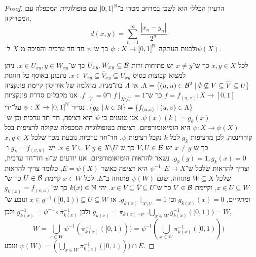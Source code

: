 \begin{proof}
	הרעיון הכללי הוא לשכן במרחב מטרי ב־${[0, 1]}^{\mathbb{N}}$ עם טופולוגיית המכפלה עם המטריקה,
	\[
		d(x, y)
		= \sum_{n = 1}^\infty \frac{|x_n - y_n|}{2^n}
	\]
	ולבנות העתקה $\psi : X \to {[0, 1]}^{\mathbb{N}}$ כך ש־$\psi$ חד־חד ערכית והפיכה מ־$X$ ל־$\psi(X)$.

	לכל $x, y \in X$ כך ש־$x \ne y$ יש פתוחות זרות $U_{xy}, W_{xy} \subseteq \mathcal{B}$ כך ש־$x \in U_{xy}, y \in W_{xy}$.
	ניתן למצוא קבוצות בסיס $x \in V_{xy} \subseteq \overline{V}_{xy} \subseteq U_{xy}$.
	נתבונן באוסף כל הזוגות $\Lambda = \{ (u, u) \in \mathcal{B}^2 \mid \emptyset \not\subseteq V \subseteq \overline{V} \subseteq U \}$.
	אז $\Lambda$ בת־מניה.
	מהלמה של אוריסון קיימת פונקציה $f = f_{(u, v)} : X \to [0, 1]$ כך ש־$f \mid_{X \setminus U} = 1$ ו־$f \mid_{\overline{V}} = 0$.
	אנו מקבלים סדרת פונקציות $\{ g_k \mid k \in \mathbb{N} \} = \{ f_{(u, v)} \mid (u, v) \in \Lambda \}$.
	נגדיר $\psi : X \to {[0, 1]}^{\mathbb{N}}$ על־ידי $\psi(x)(k) = g_k(x)$.
	אנו טוענים כי $\psi$ היא רציפה, חד־חד ערכית וכן ש־$\psi : X \to \psi(X)$ היא הומיאומורפיזם.
	רציפות בטופולוגיית המכפלה שקולה לרציפות בכל קורדינטה, לכן מרציפות $g_k$ לכל $k$ נקבל רציפות $\psi$.
	חד־חד ערכיות נובעת מכך שלכל $x, y \in X$ כך ש־$x \ne y$ יש $V, U \in \mathcal{B}$ כך ש־$x \in V \subseteq \overline{V}, y \in X \setminus U$.
	יש $g_k = f_{(v, u)}$ ו־$g_k(y) = 1, g_k(x) = 0$.
	נשאר להראות הומיאומורפיזם.
	אנו יודעים ש־$\psi$ חד־חד ערכית, וצריך להראות שלכל ש־$\psi^{-1} : E \to X$ היא רציפה כאשר $E = \psi(X)$, כלומר צריך להראות שלכל $W \subseteq X$ פתוחה, שגם $\psi(W)$ פתוחה ב־$E$.
	לכל $x \in W$ קיימת $U \in \mathcal{B}$ כך ש־$x \in U \subseteq W$, וקיימת $V \in \mathcal{B}$ כך ש־$x \in V \subseteq \overline{V} \subseteq U$.
	יהי $k(x) \in \mathbb{N}$ כך ש־$g_{k(x)} = f_{(v, u)}$ ומתקיים, $g_{k(x)}(x) = 0$ וכן $g_{k(x)} \mid_{X \setminus U} = 1$.
	אז $x \in g^{-1}([0, 1)) \subseteq U \subseteq W$ ונובע ש־$\bigcup_{x \in W} g_{k(x)}^{-1}([0, 1)) = W$.
	$g_{k(x)} = \pi_{k(x) \circ \psi}$ ולכן $g_{k(x)}^{-1} = \psi^{-1} \circ \pi_{k(x)}^{-1}$ ולכן,
	\[
		W
		= \bigcup_{x \in W} \psi^{-1}(\pi_{k(x)}^{-1}([0, 1)))
		= \psi^{-1}(\bigcup_{x \in W} \pi_{k(x)}^{-1}([0, 1)))
	\]
	ונובע $\psi(W) = (\bigcup_{x \in W} \pi_{k(x)}^{-1}([0, 1))) \cap E$.
\end{proof}

